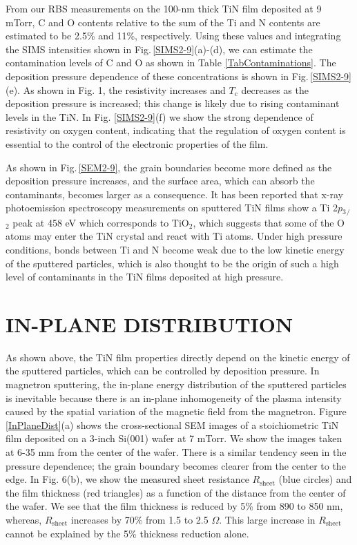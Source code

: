 \documentclass{report}
\begin{document}
From our RBS measurements on the 100-nm thick TiN film deposited at 9 mTorr, C and O contents relative to the sum of the Ti and N contents are estimated to be 2.5\% and 11\%, respectively. Using these values and integrating the SIMS intensities shown in Fig.\,\ref{SIMS2-9}(a)-(d), we can estimate the contamination levels of C and O as shown in Table \ref{TabContaminations}. The deposition pressure dependence of these concentrations is shown in Fig.\,\ref{SIMS2-9}(e). As shown in Fig. 1, the resistivity increases and $T{_\text{c}}$ decreases as the deposition pressure is increased; this change is likely due to rising contaminant levels in the TiN.  In Fig. \ref{SIMS2-9}(f) we show the strong dependence of resistivity on oxygen content, indicating that the regulation of oxygen content is essential to the control of the electronic properties of the film.

As shown in Fig.\,\ref{SEM2-9}, the grain boundaries become more defined as the deposition pressure increases, and the surface area, which can absorb the contaminants, becomes larger as a consequence. It has been reported that x-ray photoemission spectroscopy measurements on sputtered TiN films show a Ti 2$p{_3}$${_\slash}$${_2}$ peak at 458 eV which corresponds to TiO$_{2}$,\cite{Logothetidis1999} which suggests that some of the O atoms may enter the TiN crystal and react with Ti atoms. Under high pressure conditions, bonds between Ti and N become weak due to the low kinetic energy of the sputtered particles, which is also thought to be the origin of such a high level of contaminants in the TiN films deposited at high pressure.

\section{IN-PLANE DISTRIBUTION}
\label{IN-PLANE DISTRIBUTION}

As shown above, the TiN film properties directly depend on the kinetic energy of the sputtered particles, which can be controlled by deposition pressure. In magnetron sputtering, the in-plane energy distribution of the sputtered particles is inevitable because there is an in-plane inhomogeneity of the plasma intensity caused by the spatial variation of the magnetic field from the magnetron. Figure \,\ref{InPlaneDist}(a) shows the cross-sectional SEM images of a stoichiometric TiN film deposited on a 3-inch Si(001) wafer at 7 mTorr. We show the images taken at 6-35 mm from the center of the wafer. There is a similar tendency seen in the pressure dependence; the grain boundary becomes clearer from the center to the edge. In Fig. 6(b), we show the measured sheet resistance $R$$_{\text{sheet}}$ (blue circles) and the film thickness (red triangles) as a function of the distance from the center of the wafer. We see that the film thickness is reduced by 5\% from 890 to 850 nm, whereas, $R$$_{\text{sheet}}$ increases by 70\% from 1.5 to 2.5 $\Omega$. This large increase in $R$$_{\text{sheet}}$ cannot be explained by the 5\% thickness reduction alone.
\end{document}

